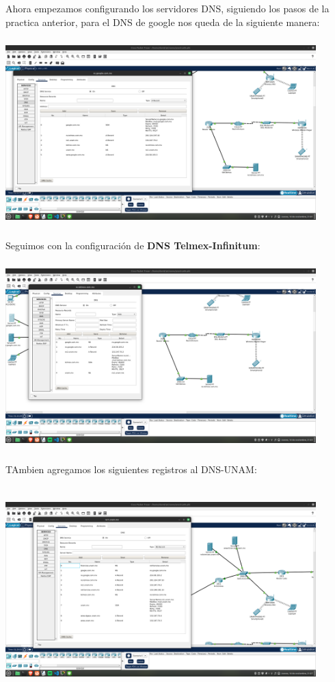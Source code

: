 \documentclass[14pt]{book}
\begin{document}
Ahora empezamos configurando los servidores DNS, siguiendo los pasos de la practica anterior, para el DNS de google nos queda de la siguiente manera:\\

\includegraphics[width=12cm, height=8cm]{images/dns_google.png}\\

Seguimos con la configuración de \textbf{DNS Telmex-Infinitum}:\\

\includegraphics[width=12cm, height=8cm]{images/DNS Telmex-Infinitum.png}\\

TAmbien agregamos los siguientes registros al DNS-UNAM:

\includegraphics[width=12cm, height=8cm]{images/dns unam.png}\\
\end{document}
